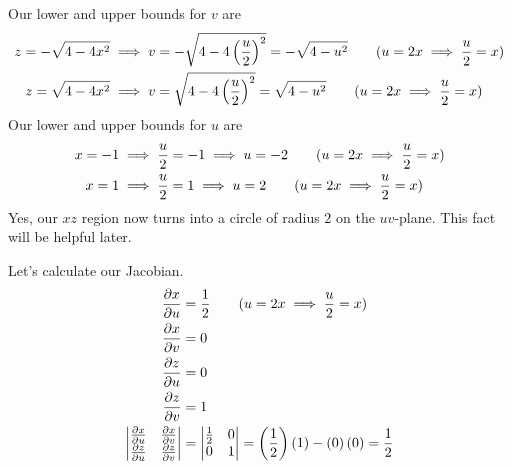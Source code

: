 \documentclass{article}
\newcommand{\lrp}[1]{\left( #1 \right)}
\begin{document}
Our lower and upper bounds for $v$ are
\begin{align*}
    z=-\sqrt{4-4x^2}&\implies v = -\sqrt{4-4\lrp{\frac{u}{2}}^2}=-\sqrt{4-u^2}\tag{$u=2x\implies \dfrac{u}{2}=x$}\\
    z=\sqrt{4-4x^2}&\implies v = \sqrt{4-4\lrp{\frac{u}{2}}^2}=\sqrt{4-u^2}\tag{$u=2x\implies \dfrac{u}{2}=x$}
\end{align*}
Our lower and upper bounds for $u$ are
\begin{align*}
    x=-1&\implies \frac{u}{2}=-1\implies u = -2\tag{$u=2x\implies \dfrac{u}{2}=x$}\\
    x=1&\implies \frac{u}{2}=1\implies u = 2\tag{$u=2x\implies \dfrac{u}{2}=x$}
\end{align*}
Yes, our $xz$ region now turns into a circle of radius $2$ on the $uv$-plane. This fact will be helpful later.
\begin{center}
\end{center}
Let's calculate our Jacobian.
\begin{align*}
    \frac{\partial x}{\partial u}&=\frac{1}{2}\tag{$u=2x\implies \dfrac{u}{2}=x$}\\
    \frac{\partial x}{\partial v}&=0\\
    \frac{\partial z}{\partial u}&=0\\
    \frac{\partial z}{\partial v}&=1\\
    \begin{vmatrix}\frac{\partial x}{\partial u}&\frac{\partial x}{\partial v}\\ \frac{\partial z}{\partial u}&\frac{\partial z}{\partial v}\end{vmatrix}&=\begin{vmatrix}
    \frac{1}{2} & 0\\
    0 & 1
    \end{vmatrix}=\lrp{\frac{1}{2}}\lrp{1}-\lrp{0}\lrp{0}=\frac{1}{2}
\end{align*}
\end{document}
